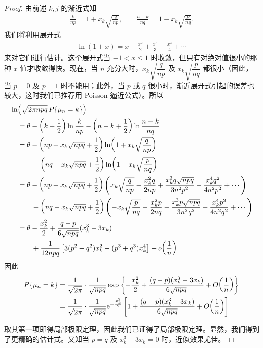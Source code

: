 \documentclass[../../main.tex]{subfiles}
\begin{document}
\begin{proof}
由前述 $k,j$ 的渐近式知
\begin{align}
\frac{k}{np}=1+x_k\sqrt{\frac{q}{np}},\qquad \frac{n-k}{nq}=1-x_k\sqrt{\frac{p}{nq}}.
\end{align}
我们将利用展开式
\begin{align}
\ln(1+x)=x-\frac{x^{2}}2+\frac{x^{3}}3-\frac{x^{4}}4+\cdots
\end{align}
来对它们进行估计。这个展开式当 $-1<x\leqslant1$ 时收敛，但只有对绝对值很小的那种 $x$ 值才收敛得快。现在，当 $n$ 充分大时，$x_k\sqrt{\dfrac{q}{np}}$ 及 $x_k\sqrt{\dfrac{p}{nq}}$ 都很小（因此，当 $p=0$ 及 $p=1$ 时不能用；此外，当 $p$ 或 $q$ 很小时，渐近展开式引起的误差也较大，这时我们已推荐用 Poisson 逼近公式）。所以
\begin{align}
&\ln\!\left(\sqrt{2\pi npq}\,P\{\mu_n=k\}\right)\notag\\
&\quad=\theta-\left(k+\frac12\right)\ln\frac{k}{np}-\left(n-k+\frac12\right)\ln\frac{n-k}{nq}\notag\\
&\quad=\theta-\left(np+x_k\sqrt{npq}+\frac12\right)\ln\!\left(1+x_k\sqrt{\frac{q}{np}}\right)\notag\\
&\qquad\quad-\left(nq-x_k\sqrt{npq}+\frac12\right)\ln\!\left(1-x_k\sqrt{\frac{p}{nq}}\right)\notag\\
&\quad=\theta-\left(np+x_k\sqrt{npq}+\frac12\right)\left(x_k\sqrt{\frac{q}{np}}-\frac{x_k^{2}q}{2np}+\frac{x_k^{3}q\sqrt{npq}}{3n^{2}p^{2}}-\frac{x_k^{4}q^{2}}{4n^{2}p^{2}}+\cdots\right)\notag\\
&\qquad\quad-\left(nq-x_k\sqrt{npq}+\frac12\right)\left(-x_k\sqrt{\frac{p}{nq}}-\frac{x_k^{2}p}{2nq}-\frac{x_k^{3}p\sqrt{npq}}{3n^{2}q^{2}}-\frac{x_k^{4}p^{2}}{4n^{2}q^{2}}+\cdots\right)\notag\\
&\quad=\theta-\frac{x_k^{2}}2+\frac{q-p}{6\sqrt{npq}}(x_k^{3}-3x_k)\notag\\
&\qquad\quad+\frac{1}{12npq}\left[3(p^{2}+q^{2})x_k^{2}-(p^{3}+q^{3})x_k^{4}\right]+o\!\left(\frac1n\right).
\end{align}
因此
\begin{align}
P\{\mu_n=k\}
&=\frac{1}{\sqrt{2\pi}}\cdot\frac{1}{\sqrt{npq}}\exp\left\{-\frac{x_k^{2}}2+\frac{(q-p)(x_k^{3}-3x_k)}{6\sqrt{npq}}+O\!\left(\frac1n\right)\right\}\notag\\
&=\frac{1}{\sqrt{2\pi}}\cdot\frac{1}{\sqrt{npq}}\mathrm{e}^{-\frac{x_k^{2}}2}\left[1+\frac{(q-p)(x_k^{3}-3x_k)}{6\sqrt{npq}}+O\!\left(\frac1n\right)\right].
\end{align}

取其第一项即得局部极限定理，因此我们已证得了局部极限定理。显然，我们得到了更精确的估计式。又知当 $p=q$ 及 $x_k^{3}-3x_k=0$ 时，近似效果尤佳。


\end{proof}
\end{document}
